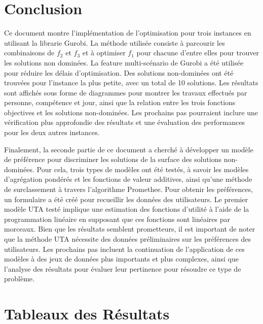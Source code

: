 \documentclass[12pt, a4paper, french, version=last, parskip=half, titlepage]{scrartcl}
\begin{document}

\section{Conclusion}

Ce document montre l'implémentation de l'optimisation pour trois instances en utilisant la librarie Gurobi. La méthode utilisée consiste à parcourir les combinaisons de $f_2$ et $f_3$ et à optimiser $f_1$ pour chacune d'entre elles pour trouver les solutions non dominées. La feature multi-scénario de Gurobi a été utilisée pour réduire les délais d'optimisation. Des solutions non-dominées ont été trouvées pour l'instance la plus petite, avec un total de 10 solutions. Les résultats sont affichés sous forme de diagrammes pour montrer les travaux effectués par personne, compétence et jour, ainsi que la relation entre les trois fonctions objectives et les solutions non-dominées. Les prochains pas pourraient inclure une vérification plus approfondie des résultats et une évaluation des performances pour les deux autres instances.

Finalement, la seconde partie de ce document a cherché à développer un modèle de préférence pour discriminer les solutions de la surface des solutions non-dominées. Pour cela, trois types de modèles ont été testés, à savoir les modèles d'agrégation pondérés et les fonctions de valeur additives, ainsi qu'une méthode de surclassement à travers l'algorithme Promethee. Pour obtenir les préférences, un formulaire a été créé pour recueillir les données des utilisateurs. Le premier modèle UTA testé implique une estimation des fonctions d'utilité à l'aide de la programmation linéaire en supposant que ces fonctions sont linéaires par morceaux. Bien que les résultats semblent prometteurs, il est important de noter que la méthode UTA nécessite des données préliminaires sur les préférences des utilisateurs. Les prochains pas incluent la continuation de l'application de ces modèles à des jeux de données plus importants et plus complexes, ainsi que l'analyse des résultats pour évaluer leur pertinence pour résoudre ce type de problème.

\clearpage
\appendix

\section{Tableaux des Résultats}
\label{sec:tables}
\end{document}
